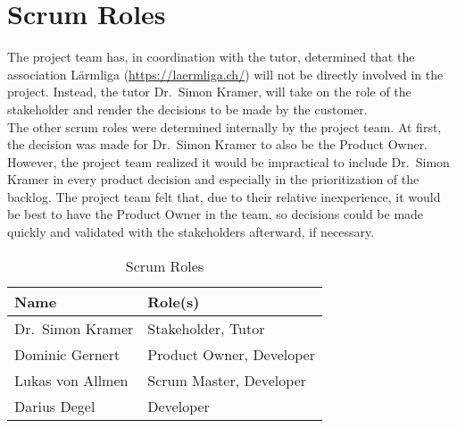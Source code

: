 \section{Scrum Roles}\label{sec:scrum_roles}
The project team has, in coordination with the tutor, determined that the association Lärmliga (\url{https://laermliga.ch/}) will not be directly involved
in the project.
Instead, the tutor Dr.\ Simon Kramer, will take on the role of the stakeholder and render the decisions to be made by the customer. \\
The other scrum roles were determined internally by the project team.
At first, the decision was made for Dr.\ Simon Kramer to also be the Product Owner.
However, the project team realized it would be impractical to include Dr.\ Simon Kramer in every product decision and especially in the prioritization of the backlog.
The project team felt that, due to their relative inexperience, it would be best to have the Product Owner in the team, so decisions could be made quickly and validated
with the stakeholders afterward, if necessary.
\begin{table}[H]
    \centering
    \begin{tabular}{l l}
        \toprule
        \textbf{Name}     & \textbf{Role(s)}         \\
        \midrule
        Dr.\ Simon Kramer & Stakeholder, Tutor       \\
        \midrule
        Dominic Gernert   & Product Owner, Developer \\
        \midrule
        Lukas von Allmen  & Scrum Master, Developer  \\
        \midrule
        Darius Degel      & Developer                \\
        \bottomrule
    \end{tabular}
    \caption{Scrum Roles}\label{table:scrum_roles}
\end{table}